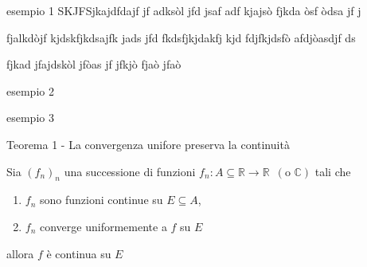 \documentclass[x11names]{article}
\newcommand{\esempio}[2]{
	\begin{es}{esempio #1}
		#2
	\end{es}
}
\newcommand{\teorema}[2]{
	\begin{center}
		\fboxsep11pt
		\colorbox{myred}{\begin{minipage}{5.75in}
				\begin{redes}{#1}
					#2
				\end{redes}
		\end{minipage}}
	\end{center}
}
\begin{document}
\esempio{1}{SKJFSjkajdfdajf  jf adksòl jfd jsaf
adf kjajsò fjkda òsf òdsa jf j

fjalkdòjf kjdskfjkdsajfk jads jfd fkdsfjkjdakfj kjd fdjfkjdsfò afdjòasdjf  ds

fjkad jfajdskòl jfòas jf jfkjò fjaò jfaò}
\esempio{2}{}
\esempio{3}{}



\teorema{Teorema 1 - La convergenza unifore preserva la continuità}{
Sia \((f_{n})_{n}\) una successione di funzioni \(f_{n}:A\subseteq \mathbb{R}\to \mathbb{R} \;\ (\text{o } \mathbb{C})\) tali che
\begin{enumerate}[start=1,label={(\itshape H\arabic*)}]
	\item \(f_{n}\) sono funzioni continue su \(E\subseteq A\),
	\item \(f_{n}\) converge uniformemente a \(f\) su \(E\)
\end{enumerate}
allora \(f\) è continua su \(E\)
}
\end{document}
